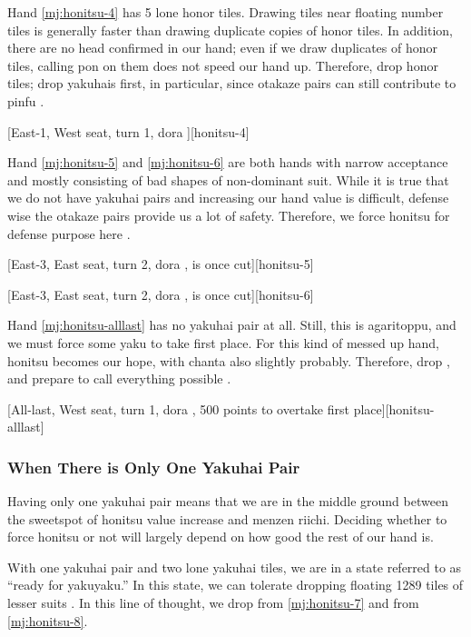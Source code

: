 \documentclass[12pt]{article}
\begin{document}
Hand \ref{mj:honitsu-4} has 5 lone honor tiles. Drawing tiles near floating number tiles is generally faster than drawing duplicate copies of honor tiles. In addition, there are no head confirmed in our hand; even if we draw duplicates of honor tiles, calling pon on them does not speed our hand up. Therefore, drop honor tiles; drop yakuhais first, in particular, since otakaze pairs can still contribute to pinfu \citep{yuusee-honitsu}.

[East-1, West seat, turn 1, dora ][honitsu-4]

Hand \ref{mj:honitsu-5} and \ref{mj:honitsu-6} are both hands with narrow acceptance and mostly consisting of bad shapes of non-dominant suit. While it is true that we do not have yakuhai pairs and increasing our hand value is difficult, defense wise the otakaze pairs provide us a lot of safety. Therefore, we force honitsu for defense purpose here \citep{shibukawa-honitsu}.

[East-3, East seat, turn 2, dora ,  is once cut][honitsu-5]

[East-3, East seat, turn 2, dora ,  is once cut][honitsu-6]

Hand \ref{mj:honitsu-alllast} has no yakuhai pair at all. Still, this is agaritoppu, and we must force some yaku to take first place. For this kind of messed up hand, honitsu becomes our hope, with chanta also slightly probably. Therefore, drop , and prepare to call everything possible \citep[][pp.~37--38]{kawamura-naki}.

[All-last, West seat, turn 1, dora , 500 points to overtake first place][honitsu-alllast]


\subsubsection*{When There is Only One Yakuhai Pair}

Having only one yakuhai pair means that we are in the middle ground between the sweetspot of honitsu value increase and menzen riichi. Deciding whether to force honitsu or not will largely depend on how good the rest of our hand is.

With one yakuhai pair and two lone yakuhai tiles, we are in a state referred to as ``ready for yakuyaku.'' In this state, we can tolerate dropping floating 1289 tiles of lesser suits \citep[][p.~97]{zero-teyaku}. In this line of thought, we drop  from \ref{mj:honitsu-7} and  from \ref{mj:honitsu-8}.
\end{document}
